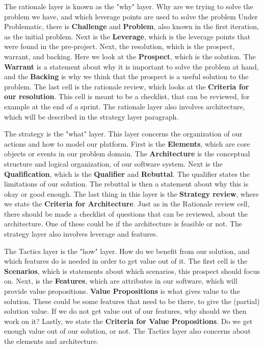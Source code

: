 The rationale layer is known as the "why" layer.
Why are we trying to solve the problem we have, and which leverage points are used to solve the problem
Under Problematic, there is \textbf{Challenge} and \textbf{Problem}, also known in the first iteration, as the initial problem.
Next is the \textbf{Leverage}, which is the leverage points that were found in the pre-project.
Next, the resolution, which is the prospect, warrant, and backing. 
Here we look at the \textbf{Prospect}, which is the solution.
The \textbf{Warrant} is a statement about why it is important to solve the problem at hand, and the \textbf{Backing} is why we think that the prospect is a useful solution to the problem.
The last cell is the rationale review, which looks at the \textbf{Criteria for our resolution}.
This cell is meant to be a checklist, that can be reviewed, for example at the end of a sprint.
The rationale layer also involves architecture, which will be described in the strategy layer paragraph.

The strategy is the "what" layer.
This layer concerns the organization of our actions and how to model our platform.
First is the \textbf{Elements}, which are core objects or events in our problem domain.
The \textbf{Architecture} is the conceptual structure and logical organization, of our software system.
Next is the \textbf{Qualification}, which is the \textbf{Qualifier} and \textbf{Rebuttal}.
The qualifier states the limitations of our solution.
The rebuttal is then a statement about why this is okay or good enough.
The last thing in this layer is the \textbf{Strategy review}, where we state the \textbf{Criteria for Architecture}.
Just as in the Rationale review cell, there should be made a checklist of questions that can be reviewed, about the architecture.
One of these could be if the architecture is feasible or not.
The strategy layer also involves leverage and features.

The Tactics layer is the "how" layer.
How do we benefit from our solution, and which features do is needed in order to get value out of it.
The first cell is the \textbf{Scenarios}, which is statements about which scenarios, this prospect should focus on.
Next, is the \textbf{Features}, which are attributes in our software, which will provide value propositions.
\textbf{Value Propositions} is what gives value to the solution.
These could be some features that need to be there, to give the (partial) solution value. 
If we do not get value out of our features, why should we then work on it?
Lastly, we state the \textbf{Criteria for Value Propositions}.
Do we get enough value out of our solution, or not.
The Tactics layer also concerns about the elements and architecture.

